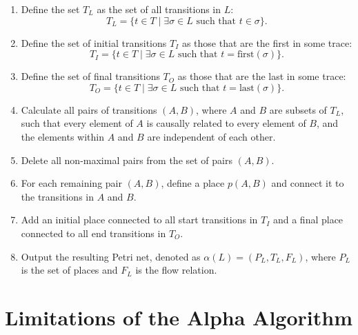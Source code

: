     \begin{enumerate}
        \item Define the set \(T_L\) as the set of all transitions in \(L\): \[
        T_L = \{ t \in T \mid \exists \sigma \in L \text{ such that } t \in \sigma \}.
        \]
        \item Define the set of initial transitions \(T_I\) as those that are the first in some trace: \[
        T_I = \{ t \in T \mid \exists \sigma \in L \text{ such that } t = \text{first}(\sigma) \}.
        \]
        \item Define the set of final transitions \(T_O\) as those that are the last in some trace: \[
        T_O = \{ t \in T \mid \exists \sigma \in L \text{ such that } t = \text{last}(\sigma) \}.
        \]
        \item Calculate all pairs of transitions \( (A, B) \), where \(A\) and \(B\) are subsets of \(T_L\), such that every element of \(A\) is causally related to every element of \(B\), and the elements within \(A\) and \(B\) are independent of each other.
        \item Delete all non-maximal pairs from the set of pairs \( (A, B) \).
        \item For each remaining pair \( (A, B) \), define a place \(p(A, B)\) and connect it to the transitions in \(A\) and \(B\).
        \item Add an initial place connected to all start transitions in \(T_I\) and a final place connected to all end transitions in \(T_O\).
        \item Output the resulting Petri net, denoted as \( \alpha(L) = (P_L, T_L, F_L) \), where \(P_L\) is the set of places and \(F_L\) is the flow relation.
    \end{enumerate}
    
    \section{Limitations of the Alpha Algorithm}
    
